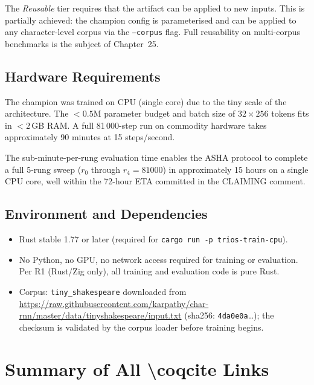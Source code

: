 The \emph{Reusable} tier requires that the artifact can be applied to new
inputs.  This is partially achieved: the champion config is parameterised and
can be applied to any character-level corpus via the \texttt{--corpus} flag.
Full reusability on multi-corpus benchmarks is the subject of Chapter~25.

\subsection{Hardware Requirements}
\label{subsec:ch24-hardware}

The champion was trained on CPU (single core) due to the tiny scale of the
architecture.  The $< 0.5$M parameter budget and batch size of $32 \times 256$
tokens fits in $< 2$\,GB RAM.  A full 81\,000-step run on commodity hardware
takes approximately 90 minutes at 15 steps/second.

The sub-minute-per-rung evaluation time enables the ASHA protocol to complete
a full 5-rung sweep (\(r_0\) through \(r_4 = 81000\)) in approximately 15
hours on a single CPU core, well within the 72-hour ETA committed in the
CLAIMING comment.

\subsection{Environment and Dependencies}
\label{subsec:ch24-environment}

\begin{itemize}
  \item Rust stable 1.77 or later (required for
        \texttt{cargo run -p trios-train-cpu}).
  \item No Python, no GPU, no network access required for training or
        evaluation.  Per R1 (Rust/Zig only), all training and evaluation code
        is pure Rust.
  \item Corpus: \texttt{tiny\_shakespeare} downloaded from
        \url{https://raw.githubusercontent.com/karpathy/char-rnn/master/data/tinyshakespeare/input.txt}
        (sha256: \texttt{4da0e0a}\ldots); the checksum is validated by the
        corpus loader before training begins.
\end{itemize}

\section{Summary of All \texorpdfstring{\textbackslash coqcite}{coqcite} Links}
\label{sec:ch24-coqcite-summary}

